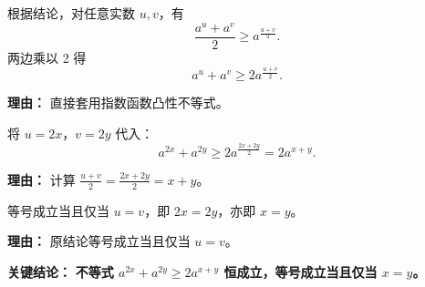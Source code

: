 \begin{examplebox}
\begin{description}[style=nextline, leftmargin=2.8em, labelsep=0.5em, itemsep=0.45em]
    \item[\textbf{第二步（应用标准形式）：}] 根据结论，对任意实数 $u,v$，有
    \[
    \frac{a^{u}+a^{v}}{2} \geq a^{\frac{u+v}{2}}.
    \]
    两边乘以 2 得
    \[
    a^{u}+a^{v} \geq 2a^{\frac{u+v}{2}}.
    \]
    \par\textbf{理由：}
    直接套用指数函数凸性不等式。

    \item[\textbf{第三步（回代变量）：}] 将 $u=2x$，$v=2y$ 代入：
    \[
    a^{2x}+a^{2y} \geq 2a^{\frac{2x+2y}{2}} = 2a^{x+y}.
    \]
    \par\textbf{理由：}
    计算 $\frac{u+v}{2} = \frac{2x+2y}{2}=x+y$。

    \item[\textbf{第四步（等号条件）：}] 等号成立当且仅当 $u=v$，即 $2x=2y$，亦即 $x=y$。
    \par\textbf{理由：}
    原结论等号成立当且仅当 $u=v$。
\end{description}

\textbf{\textcolor{CExample}{关键结论：}} \textbf{不等式 $a^{2x}+a^{2y} \geq 2a^{x+y}$ 恒成立，等号成立当且仅当 $x=y$。}
\end{examplebox}

